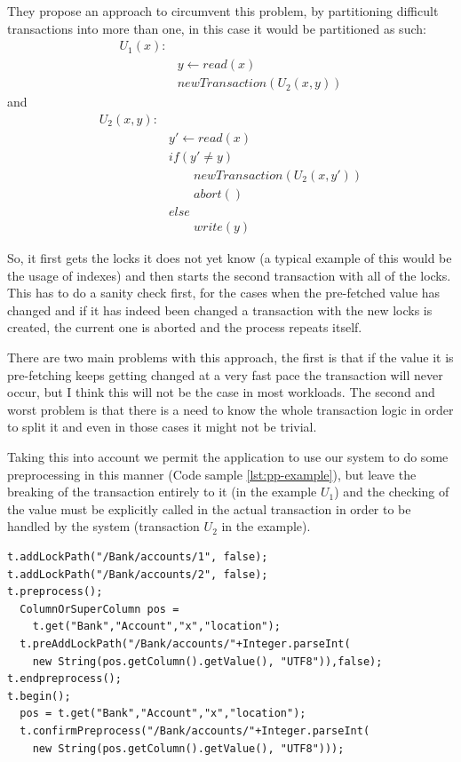 They propose an approach to circumvent this problem, by partitioning difficult transactions into more than one, in this case it would be partitioned as such:
\begin{align*}
U_{1}(x):& \\
&y \gets read(x)\\
&newTransaction(U_{2}(x,y))
\end{align*}
and
\begin{align*}
U_{2}(x,y):&\\
&y' \gets read(x)\\
&if (y' \neq y)\\
&\qquad newTransaction(U_{2}(x,y'))\\
&\qquad abort()\\
&else\\
&\qquad write(y)
\end{align*}

So, it first gets the locks it does not yet know (a typical example of this would be the usage of indexes) and then starts the second transaction with all of the locks. This has to do a sanity check first, for the cases when the pre-fetched value has changed and if it has indeed been changed a transaction with the new locks is created, the current one is aborted and the process repeats itself.

There are two main problems with this approach, the first is that if the value it is pre-fetching keeps getting changed at a very fast pace the transaction will never occur, but I think this will not be the case in most workloads. The second and worst problem is that there is a need to know the whole transaction logic in order to split it and even in those cases it might not be trivial. 

Taking this into account we permit the application to use our system to do some preprocessing in this manner (Code sample \ref{lst:pp-example}), but leave the breaking of the transaction entirely to it (in the example $U_{1}$) and the checking of the value must be explicitly called in the actual transaction in order to be handled by the system (transaction $U_{2}$ in the example).

\lstset{
  language=Java, 
  caption=Pre-processing example, 
  label=lst:pp-example,
}

\begin{shaded}
\begin{lstlisting}
t.addLockPath("/Bank/accounts/1", false);
t.addLockPath("/Bank/accounts/2", false);
t.preprocess();
  ColumnOrSuperColumn pos = 
    t.get("Bank","Account","x","location");
  t.preAddLockPath("/Bank/accounts/"+Integer.parseInt(
	new String(pos.getColumn().getValue(), "UTF8")),false);
t.endpreprocess();
t.begin();
  pos = t.get("Bank","Account","x","location");
  t.confirmPreprocess("/Bank/accounts/"+Integer.parseInt(
    new String(pos.getColumn().getValue(), "UTF8")));
\end{lstlisting}  
\end{shaded}

